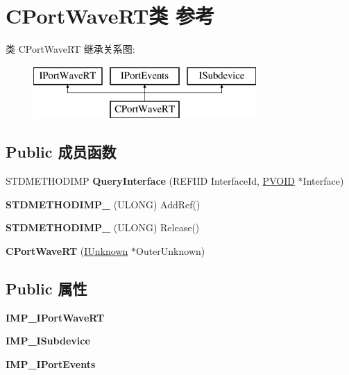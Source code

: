 \hypertarget{class_c_port_wave_r_t}{}\section{C\+Port\+Wave\+R\+T类 参考}
\label{class_c_port_wave_r_t}
类 C\+Port\+Wave\+RT 继承关系图\+:\begin{figure}[H]
\begin{center}
\leavevmode
\includegraphics[height=2.000000cm]{class_c_port_wave_r_t}
\end{center}
\end{figure}
\subsection*{Public 成员函数}
\begin{DoxyCompactItemize}
\item 
\mbox{\label{class_c_port_wave_r_t_a3a0fa115f242979f05d01d806571a7bf}} 
S\+T\+D\+M\+E\+T\+H\+O\+D\+I\+MP {\bfseries Query\+Interface} (R\+E\+F\+I\+ID Interface\+Id, \hyperlink{interfacevoid}{P\+V\+O\+ID} $\ast$Interface)
\item 
\mbox{\label{class_c_port_wave_r_t_aeb06fc9b47351a9e0770da422d4a6571}} 
{\bfseries S\+T\+D\+M\+E\+T\+H\+O\+D\+I\+M\+P\+\_\+} (U\+L\+O\+NG) Add\+Ref()
\item 
\mbox{\label{class_c_port_wave_r_t_a8b22b38e1b3325b2ee6fd86c19d3cf01}} 
{\bfseries S\+T\+D\+M\+E\+T\+H\+O\+D\+I\+M\+P\+\_\+} (U\+L\+O\+NG) Release()
\item 
\mbox{\label{class_c_port_wave_r_t_a1ecae17153d3cfd99278ea896e62f249}} 
{\bfseries C\+Port\+Wave\+RT} (\hyperlink{interface_i_unknown}{I\+Unknown} $\ast$Outer\+Unknown)
\end{DoxyCompactItemize}
\subsection*{Public 属性}
\begin{DoxyCompactItemize}
\item 
\mbox{\label{class_c_port_wave_r_t_ab00c83c0ed95f8b4ed23323a59ed7e6d}} 
{\bfseries I\+M\+P\+\_\+\+I\+Port\+Wave\+RT}
\item 
\mbox{\label{class_c_port_wave_r_t_a8f33cb377e31a8dd21097ba50ce31ba3}} 
{\bfseries I\+M\+P\+\_\+\+I\+Subdevice}
\item 
\mbox{\label{class_c_port_wave_r_t_a00a8d6bbccfde5d1a9d28f5c46facd9f}} 
{\bfseries I\+M\+P\+\_\+\+I\+Port\+Events}
\end{DoxyCompactItemize}
